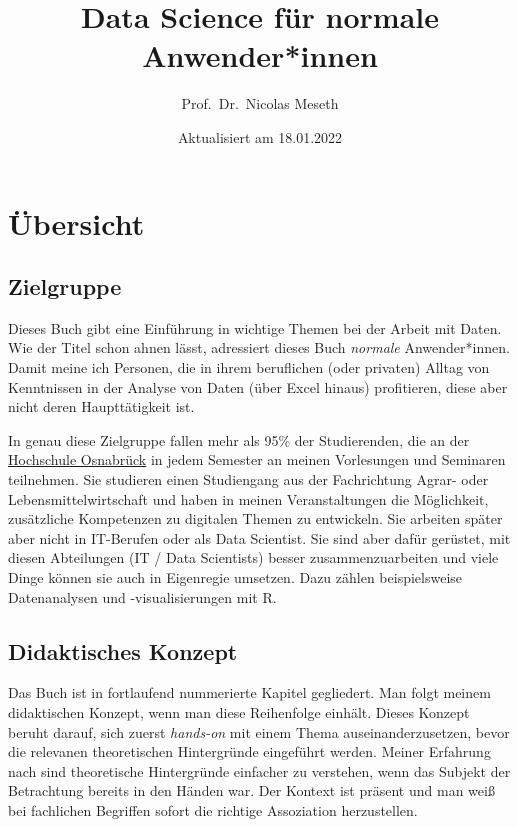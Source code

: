 \documentclass[
]{book}
\title{Data Science für normale Anwender*innen}
\author{Prof.~Dr.~Nicolas Meseth}
\date{Aktualisiert am 18.01.2022}
\begin{document}
\maketitle

{
\setcounter{tocdepth}{1}
\tableofcontents
}
\hypertarget{uxfcbersicht}{%
\chapter*{Übersicht}\label{uxfcbersicht}}

\hypertarget{zielgruppe}{%
\section*{Zielgruppe}\label{zielgruppe}}

Dieses Buch gibt eine Einführung in wichtige Themen bei der Arbeit mit Daten. Wie der Titel schon ahnen lässt, adressiert dieses Buch \emph{normale} Anwender*innen. Damit meine ich Personen, die in ihrem beruflichen (oder privaten) Alltag von Kenntnissen in der Analyse von Daten (über Excel hinaus) profitieren, diese aber nicht deren Haupttätigkeit ist.

In genau diese Zielgruppe fallen mehr als 95\% der Studierenden, die an der \href{https://hs-osnabrueck.de}{Hochschule Osnabrück} in jedem Semester an meinen Vorlesungen und Seminaren teilnehmen. Sie studieren einen Studiengang aus der Fachrichtung Agrar- oder Lebensmittelwirtschaft und haben in meinen Veranstaltungen die Möglichkeit, zusätzliche Kompetenzen zu digitalen Themen zu entwickeln. Sie arbeiten später aber nicht in IT-Berufen oder als Data Scientist. Sie sind aber dafür gerüstet, mit diesen Abteilungen (IT / Data Scientists) besser zusammenzuarbeiten und viele Dinge können sie auch in Eigenregie umsetzen. Dazu zählen beispielsweise Datenanalysen und -visualisierungen mit R.

\hypertarget{didaktisches-konzept}{%
\section*{Didaktisches Konzept}\label{didaktisches-konzept}}

Das Buch ist in fortlaufend nummerierte Kapitel gegliedert. Man folgt meinem didaktischen Konzept, wenn man diese Reihenfolge einhält. Dieses Konzept beruht darauf, sich zuerst \emph{hands-on} mit einem Thema auseinanderzusetzen, bevor die relevanen theoretischen Hintergründe eingeführt werden. Meiner Erfahrung nach sind theoretische Hintergründe einfacher zu verstehen, wenn das Subjekt der Betrachtung bereits in den Händen war. Der Kontext ist präsent und man weiß bei fachlichen Begriffen sofort die richtige Assoziation herzustellen.
\end{document}
